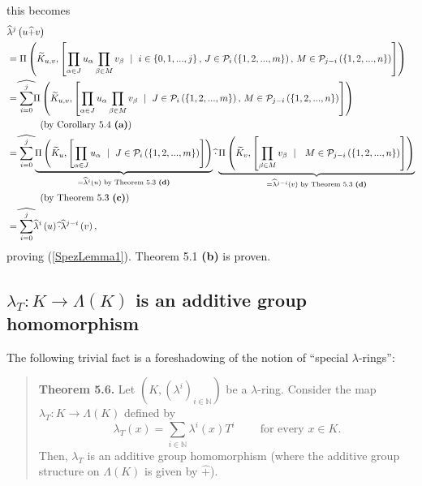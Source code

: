 \documentclass[numbers=enddot,12pt,final,onecolumn,notitlepage]{scrartcl}%
\begin{document}
this becomes%
\begin{align*}
&  \widehat{\lambda}^{j}\left(  u\widehat{+}v\right) \\
&  =\Pi\left(  \widetilde{K}_{u,v},\left[  \prod\limits_{\alpha\in J}%
u_{\alpha}\prod\limits_{\beta\in M}v_{\beta}\ \mid\ i\in\left\{
0,1,...,j\right\}  \text{, }J\in\mathcal{P}_{i}\left(  \left\{
1,2,...,m\right\}  \right)  \text{, }M\in\mathcal{P}_{j-i}\left(  \left\{
1,2,...,n\right\}  \right)  \right]  \right) \\
&  =\widehat{\sum_{i=0}^{j}}\Pi\left(  \widetilde{K}_{u,v},\left[
\prod\limits_{\alpha\in J}u_{\alpha}\prod\limits_{\beta\in M}v_{\beta}%
\ \mid\ J\in\mathcal{P}_{i}\left(  \left\{  1,2,...,m\right\}  \right)
\text{, }M\in\mathcal{P}_{j-i}\left(  \left\{  1,2,...,n\right\}  \right)
\right]  \right) \\
&  \ \ \ \ \ \ \ \ \ \ \left(  \text{by Corollary 5.4 \textbf{(a)}}\right) \\
&  =\widehat{\sum_{i=0}^{j}}\underbrace{\Pi\left(  \widetilde{K}_{u},\left[
\prod\limits_{\alpha\in J}u_{\alpha}\ \mid\ J\in\mathcal{P}_{i}\left(
\left\{  1,2,...,m\right\}  \right)  \right]  \right)  }_{=\widehat{\lambda
}^{i}\left(  u\right)  \text{ by Theorem 5.3 \textbf{(d)}}}\widehat{\cdot
}\underbrace{\Pi\left(  \widetilde{K}_{v},\left[  \prod\limits_{\beta\in
M}v_{\beta}\ \mid\ \text{ }M\in\mathcal{P}_{j-i}\left(  \left\{
1,2,...,n\right\}  \right)  \right]  \right)  }_{=\widehat{\lambda}%
^{j-i}\left(  v\right)  \text{ by Theorem 5.3 \textbf{(d)}}}\\
&  \ \ \ \ \ \ \ \ \ \ \left(  \text{by Theorem 5.3 \textbf{(c)}}\right) \\
&  =\widehat{\sum_{i=0}^{j}}\widehat{\lambda}^{i}\left(  u\right)
\widehat{\cdot}\widehat{\lambda}^{j-i}\left(  v\right)  ,
\end{align*}
proving (\ref{SpezLemma1}). Theorem 5.1 \textbf{(b)} is proven.

\subsection{$\lambda_{T}:K\rightarrow\Lambda\left(  K\right)  $ is an additive
group homomorphism}

The following trivial fact is a foreshadowing of the notion of ``special
$\lambda$-rings'':

\begin{quote}
\textbf{Theorem 5.6.} Let $\left(  K,\left(  \lambda^{i}\right)
_{i\in\mathbb{N}}\right)  $ be a $\lambda$-ring. Consider the map $\lambda
_{T}:K\rightarrow\Lambda\left(  K\right)  $ defined by
\[
\lambda_{T}\left(  x\right)  =\sum\limits_{i\in\mathbb{N}}\lambda^{i}\left(
x\right)  T^{i}\ \ \ \ \ \ \ \ \ \ \text{for every }x\in K.
\]
Then, $\lambda_{T}$ is an additive group homomorphism (where the additive
group structure on $\Lambda\left(  K\right)  $ is given by $\widehat{+}$).
\end{quote}
\end{document}
